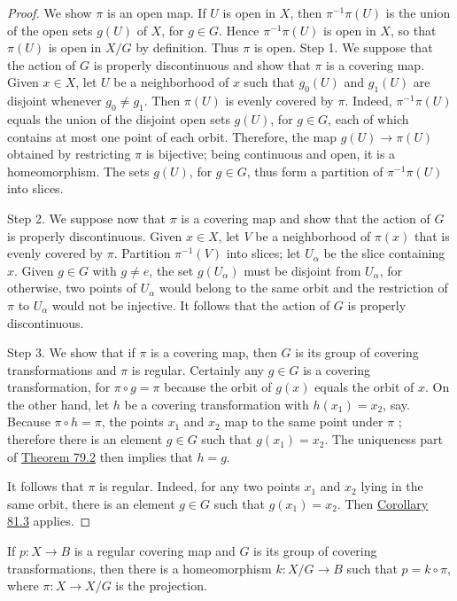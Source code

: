 \begin{proof}
	We show \(\pi\) is an open map. If \(U\) is open in \(X\), then \({\pi }^{-1}\pi ( U)\) is the union of the open sets \(g( U)\) of \(X\), for \(g \in G\). Hence \({\pi }^{-1}\pi ( U)\) is open in \(X\), so that \(\pi ( U)\) is open in \(X/G\) by definition. Thus \(\pi\) is open.
Step 1. We suppose that the action of \(G\) is properly discontinuous and show that \(\pi\) is a covering map. Given \(x \in X\), let \(U\) be a neighborhood of \(x\) such that \(g_{0}( U)\) and \(g_{1}( U)\) are disjoint whenever \(g_{0} \neq {g}_{1}\). Then \(\pi ( U)\) is evenly covered by \(\pi\). Indeed, \({\pi }^{-1}\pi ( U)\) equals the union of the disjoint open sets \(g( U)\), for \(g \in G\), each of which contains at most one point of each orbit. Therefore, the map \(g( U) \rightarrow \pi ( U)\) obtained by restricting \(\pi\) is bijective; being continuous and open, it is a homeomorphism. The sets \(g( U)\), for \(g \in G\), thus form a partition of \({\pi }^{-1}\pi ( U)\) into slices.

Step 2. We suppose now that \(\pi\) is a covering map and show that the action of \(G\) is properly discontinuous. Given \(x \in X\), let \(V\) be a neighborhood of \(\pi (x)\) that is evenly covered by \(\pi\). Partition \({\pi }^{-1}( V)\) into slices; let \(U_{\alpha }\) be the slice containing \(x\). Given \(g \in G\) with \(g \neq e\), the set \(g( U_{\alpha })\) must be disjoint from \(U_{\alpha }\), for otherwise, two points of \(U_{\alpha }\) would belong to the same orbit and the restriction of \(\pi\) to \(U_{\alpha }\) would not be injective. It follows that the action of \(G\) is properly discontinuous.

Step 3. We show that if \(\pi\) is a covering map, then \(G\) is its group of covering transformations and \(\pi\) is regular. Certainly any \(g \in G\) is a covering transformation, for \(\pi \circ g = \pi\) because the orbit of \(g(x)\) equals the orbit of \(x\). On the other hand, let \(h\) be a covering transformation with \(h( x_{1}) = x_{2}\), say. Because \(\pi \circ h = \pi\), the points \(x_{1}\) and \(x_{2}\) map to the same point under \(\pi\) ; therefore there is an element \(g \in G\) such that \(g( x_{1}) = x_{2}\). The uniqueness part of \hyperref[thm:79.2]{Theorem 79.2} then implies that \(h = g\).

It follows that \(\pi\) is regular. Indeed, for any two points \(x_{1}\) and \(x_{2}\) lying in the same orbit, there is an element \(g \in G\) such that \(g( x_{1}) = x_{2}\). Then \hyperref[cor:81.3]{Corollary 81.3} applies.
\end{proof}
\begin{theorem}
\label{thm:\thetheorem}
	If \(p : X \rightarrow B\) is a regular covering map and \(G\) is its group of covering transformations, then there is a homeomorphism \(k : X/G \rightarrow B\) such that \(p = k \circ \pi\), where \(\pi : X \rightarrow X/G\) is the projection.
\end{theorem}

